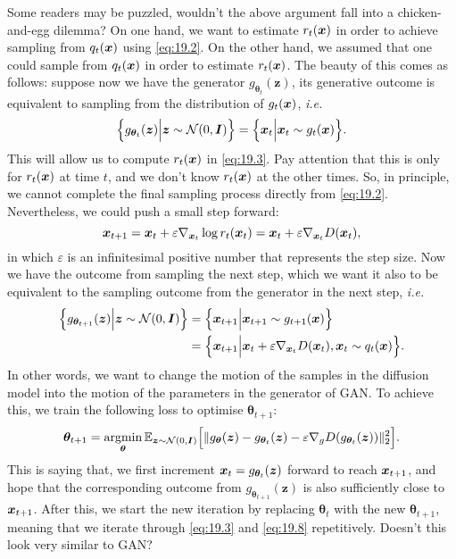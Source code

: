 Some readers may be puzzled, wouldn't the above argument fall into a chicken-and-egg dilemma? On one hand, we want to estimate $r_t(\bm{x})$ in order to achieve sampling from $q_t(\bm{x})$ using \cref{eq:19.2}. On the other hand, we assumed that one could sample from $q_t(\bm{x})$ in order to estimate $r_t(\bm{x})$. The beauty of this comes as follows: suppose now we have the generator $g_{\bm{\theta}_t}(\bm{z})$, its generative outcome is equivalent to sampling from the distribution of $g_t(\bm{x})$, \emph{i.e.}
\begin{equation}
    \label{eq:19.5}
    \Big\{g_{\bm{\theta}_t}(\bm{z})\Big\vert \bm{z}\sim\mathcal{N}(0,\bm{I})\Big\}=\Big\{\bm{x}_{t}\Big\vert\bm{x}_{t}\sim g_t(\bm{x}) \Big\}.
\end{equation}
This will allow us to compute $r_t(\bm{x})$ in \cref{eq:19.3}. Pay attention that this is only for $r_t (\bm{x})$ at time $t$, and we don't know $r_t (\bm{x})$ at the other times. So, in principle, we cannot complete the final sampling process directly from \cref{eq:19.2}. Nevertheless, we could push a small step forward:
\begin{equation}
    \label{eq:19.6}
    \bm{x}_{t+1}=\bm{x}_{t}+\varepsilon\nabla_{\bm{x}_{t}}\log r_t(\bm{x}_{t})=\bm{x}_{t}+\varepsilon\nabla_{\bm{x}_{t}}D(\bm{x}_{t}),
\end{equation}
in which $\varepsilon$ is an infinitesimal positive number that represents the step size. Now we have the outcome from sampling the next step, which we want it also to be equivalent to the sampling outcome from the generator in the next step, \emph{i.e.}
\begin{align}
    \Big\{g_{\bm{\theta}_{t+1}}(\bm{z})\Big\vert \bm{z}\sim\mathcal{N}(0,\bm{I})\Big\}&= \Big\{\bm{x}_{t+1}\Big\vert\bm{x}_{t+1}\sim g_{t+1}(\bm{x}) \Big\} \nonumber\\
    &=\Big\{ \bm{x}_{t+1}\Big\vert \bm{x}_{t}+\varepsilon\nabla_{\bm{x}_{t}}D(\bm{x}_{t}) , \bm{x}_{t}\sim q_t(\bm{x})\Big\}. \label{eq:19.7}
\end{align}
In other words, we want to change the motion of the samples in the diffusion model into the motion of the parameters in the generator of GAN. To achieve this, we train the following loss to optimise $\bm{\theta}_{t+1}$:
\begin{equation}
    \label{eq:19.8}
    \bm{\theta}_{t+1}=\operatorname*{argmin}_{\bm{\theta}}\mathbb{E}_{\bm{z}\sim\mathcal{N}(0,\bm{I})}\Big[ \Vert g_{\bm{\theta}}(\bm{z})-g_{\bm{\theta}_t}(\bm{z})-\varepsilon \nabla_g D(g_{\bm{\theta}_t}(\bm{z})) \Vert_2^2 \Big].
\end{equation}
This is saying that, we first increment $\bm{x}_{t}=g_{\bm{\theta}_t}(\bm{z})$ forward to reach $\bm{x}_{t+1}$, and hope that the corresponding outcome from $g_{\bm{\theta}_{t+1}}(\bm{z})$ is also sufficiently close to $\bm{x}_{t+1}$. After this, we start the new iteration by replacing $\bm{\theta}_t$ with the new $\bm{\theta}_{t+1}$, meaning that we iterate through \cref{eq:19.3} and \cref{eq:19.8} repetitively. Doesn't this look very similar to GAN?

